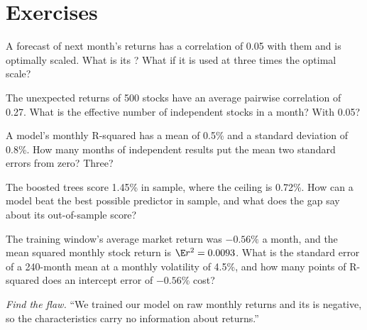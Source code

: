 \section{Exercises}

\begin{exercise}[$\star$]\label{exo:ml:why-financial-machine-learning-is-different:1}
A forecast of next month's returns has a correlation of 0.05 with them and is optimally scaled. What is its
? What if it is used at three times the optimal scale?
\end{exercise}

\begin{exercise}[$\star$]\label{exo:ml:why-financial-machine-learning-is-different:2}
The unexpected returns of 500 stocks have an average pairwise correlation of 0.27. What is the effective number of
independent stocks in a month? With 0.05?
\end{exercise}

\begin{exercise}[$\star$]\label{exo:ml:why-financial-machine-learning-is-different:3}
A model's monthly R-squared has a mean of 0.5\% and a standard deviation of 0.8\%. How many months of independent
results put the mean two standard errors from zero? Three?
\end{exercise}

\begin{exercise}[$\star\star$]\label{exo:ml:why-financial-machine-learning-is-different:4}
The boosted trees score 1.45\% in sample, where the ceiling is 0.72\%. How can a model beat the best possible predictor
in sample, and what does the gap say about its out-of-sample score?
\end{exercise}

\begin{exercise}[$\star\star$]\label{exo:ml:why-financial-machine-learning-is-different:5}
The training window's average market return was $-0.56\%$ a month, and the mean squared monthly stock return is
$\E r^2 = 0.0093$. What is the standard error of a 240-month mean at a monthly volatility
of 4.5\%, and how many points of R-squared does an intercept error of $-0.56\%$ cost?
\end{exercise}

\begin{exercise}[$\star\star$]\label{exo:ml:why-financial-machine-learning-is-different:6}
\emph{Find the flaw.} ``We trained our model on raw monthly returns and its  is negative, so the
characteristics carry no information about returns.''
\end{exercise}


